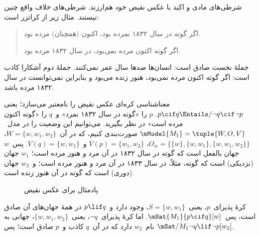 \documentclass[../../../include/open-logic-section]{subfiles}
\begin{document}


شرطی‌های مادی و اکید با عکس نقیض خود هم‌ارزند. شرطی‌های خلاف واقع چنین
نیستند. مثال زیر از کراتزر است:
\begin{quote}
  اگر گوته در سال ۱۸۳۲ نمرده بود، اکنون (همچنان) مرده بود.

  اگر گوته اکنون مرده نمی‌بود، در سال ۱۸۳۲ مرده بود.
\end{quote}
جملهٔ نخست صادق است: انسان‌ها صدها سال عمر نمی‌کنند. جملهٔ دوم آشکارا
کاذب است: اگر گوته اکنون مرده نمی‌بود، هنوز زنده می‌بود و بنابراین
نمی‌توانست در سال ۱۸۳۲ مرده باشد.

\begin{ex}
  معناشناسی کره‌ای عکس نقیض را نامعتبر می‌سازد؛ یعنی
  $p \cif q \Entails/ \lnot q \cif \lnot p$. $p$ را «گوته در سال
  ۱۸۳۲ نمرد» و~$q$ را «گوته اکنون مرده است» در نظر بگیرید. می‌توانیم
  این وضعیت را در مدل~$\mModel{M_1} = \tuple{W, O, V}$ صورت‌بندی کنیم،
  که در آن~$W = \{w, w_1, w_2\}$،
  $O_w = \{\{w\}, \{w, w_1\}, \{w, w_1, w_2\}\}$،
  $V(p) = \{w_1, w_2\}$ و~$V(q) = \{w, w_1\}$. پس~$w$ جهان بالفعل
  است که گوته در سال ۱۸۳۲ در آن مرد و هنوز مرده است؛ $w_1$ جهان
  (نزدیکی) است که گوته، مثلاً، در سال ۱۸۳۳ در آن مرد و هنوز مرده است؛
  و~$w_2$ جهان (دوری) است که گوته در آن هنوز زنده است.
\begin{figure}
\begin{center}
\caption{پادمثال برای عکس نقیض}
\end{center}
\end{figure}
کرهٔ پذیرای~$p$، یعنی~$S = \{w, w_1\}$، وجود دارد و~$p \lif q$ در
همهٔ جهان‌های آن صادق است، پس~$\mSat{M_1}{p \cif q}[w]$. اما کرهٔ
پذیرای~$\lnot q$، یعنی~$\{w, w_1, w_2\}$، جهانی به نام~$w_2$ دارد که
در آن~$q$ کاذب و~$p$ صادق است؛ پس
$\mSat/{M_1}{\lnot q \lif \lnot p}[w_2]$.
\end{ex}
\end{document}

